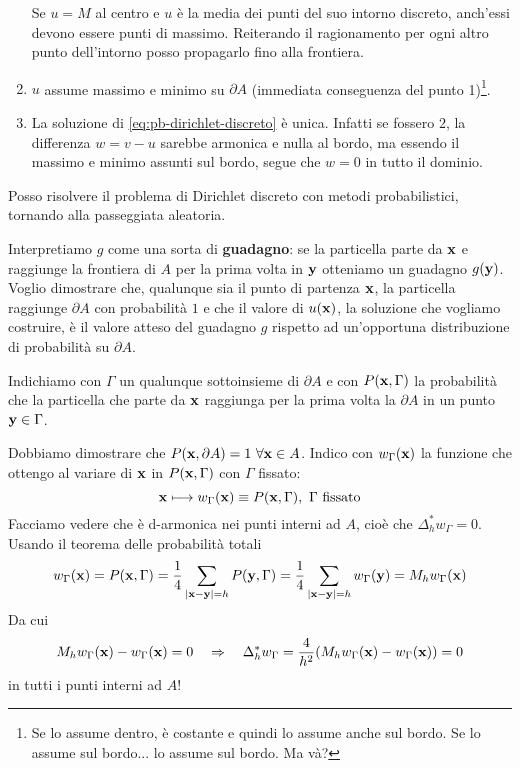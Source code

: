 \begin{enumerate}
\begin{figure}[htpb]
\begin{tikzpicture}[x=0.75pt,y=0.75pt,yscale=-1,xscale=1]
              \end{tikzpicture}
          \end{figure}
          \FloatBarrier
          Se $u=M$ al centro e $u$ è la media dei punti del suo intorno discreto, anch'essi devono essere punti di massimo. Reiterando il ragionamento per ogni altro punto dell'intorno posso propagarlo fino alla frontiera.
    \item $u$ assume massimo e minimo su $\partial A$ (immediata conseguenza del punto 1)\footnote{Se lo assume dentro, è costante e quindi lo assume anche sul bordo. Se lo assume sul bordo... lo assume sul bordo. Ma và?}.
    \item La soluzione di \eqref{eq:pb-dirichlet-discreto} è unica. Infatti se fossero $2$, la differenza $w=v-u$ sarebbe armonica e nulla al bordo, ma essendo il massimo e minimo assunti sul bordo, segue che $w=0$ in tutto il dominio.
\end{enumerate}
Posso risolvere il problema di Dirichlet discreto con metodi probabilistici, tornando alla passeggiata aleatoria.

Interpretiamo $g$ come una sorta di \textbf{guadagno}: se la particella parte da $\x$ e raggiunge la frontiera di $A$ per la prima volta in $\y$ otteniamo un guadagno $g(\y)$. Voglio dimostrare che, qualunque sia il punto di partenza $\x$, la particella raggiunge $\partial A$ con probabilità $1$ e che il valore di $u(\x)$, la soluzione che vogliamo costruire, è il valore atteso del guadagno $g$ rispetto ad un'opportuna distribuzione di probabilità su $\partial A$.

Indichiamo con $\Gamma $ un qualunque sottoinsieme di $\partial A$ e con $P(\x,\Gamma)$ la probabilità che la particella che parte da $\x$ raggiunga per la prima volta la $\partial A$ in un punto $\y\in \Gamma $.

Dobbiamo dimostrare che $P(\x,\partial A) =1\ \forall \x\in A$. Indico con $w_{\Gamma }(\x)$ la funzione che ottengo al variare di $\x$ in $P(\x,\Gamma)$ con $\Gamma $ fissato:
\begin{equation*}
    \x\longmapsto w_{\Gamma }(\x) \equiv P(\x,\Gamma),\ \Gamma \ \text{fissato}
\end{equation*}
Facciamo vedere che è d-armonica nei punti interni ad $A$, cioè che $\Delta ^{*}_{h} w_{\Gamma } =0$. Usando il teorema delle probabilità totali
\begin{equation*}
    w_{\Gamma }(\x) =P(\x,\Gamma) =\frac{1}{4}\sum _{| \x-\y| =h} P(\y,\Gamma) =\frac{1}{4}\sum _{| \x-\y| =h} w_{\Gamma }(\y) =M_{h} w_{\Gamma }(\x)
\end{equation*}
Da cui
\begin{gather*}
    M_{h} w_{\Gamma }(\x) -w_{\Gamma }(\x) =0 \quad \Rightarrow \quad \Delta ^{*}_{h} w_{\Gamma } =\frac{4}{h^{2}}(M_{h} w_{\Gamma }(\x) -w_{\Gamma }(\x)) =0
\end{gather*}
in tutti i punti interni ad $A$!

